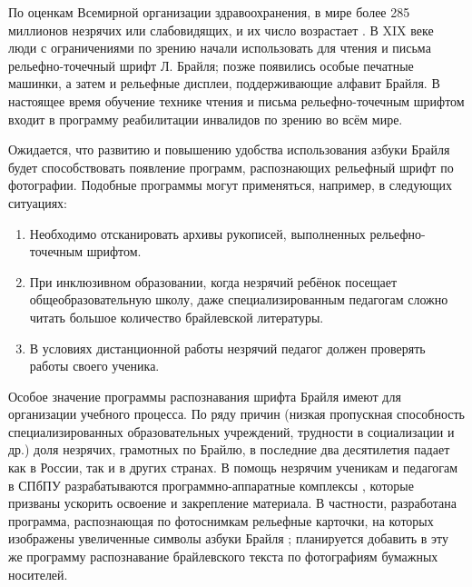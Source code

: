\documentclass{main.tex}[subfiles]
\begin{document}
По оценкам Всемирной организации здравоохранения, в мире более 285 миллионов незрячих или слабовидящих, и их число возрастает \cite{who_report2012}.
В XIX веке люди с ограничениями по зрению начали использовать для чтения и письма рельефно-точечный шрифт Л. Брайля; позже появились особые печатные машинки, а затем и рельефные дисплеи, поддерживающие алфавит Брайля.
В настоящее время обучение технике чтения и письма рельефно-точечным шрифтом входит в программу реабилитации инвалидов по зрению во всём мире.

Ожидается, что развитию и повышению удобства использования азбуки Брайля будет способствовать появление программ, распознающих рельефный шрифт по фотографии.
Подобные программы могут применяться, например, в следующих ситуациях:
\begin{enumerate}[noitemsep]
    \item Необходимо отсканировать архивы рукописей, выполненных рельефно-точечным шрифтом.
	\item При инклюзивном образовании, когда незрячий ребёнок посещает общеобразовательную школу, даже специализированным педагогам сложно читать большое количество брайлевской литературы.
    \item В условиях дистанционной работы незрячий педагог должен проверять работы своего ученика.
\end{enumerate}

Особое значение программы распознавания шрифта Брайля имеют для организации учебного процесса.
По ряду причин (низкая пропускная способность специализированных образовательных учреждений, трудности в социализации и др.) доля незрячих, грамотных по Брайлю, в последние два десятилетия падает как в России, так и в других странах.
В помощь незрячим ученикам и педагогам в СПбПУ разрабатываются программно-аппаратные комплексы \cite{begun2019, zuev2021}, которые призваны ускорить освоение и закрепление материала.
В частности, разработана программа, распознающая по фотоснимкам рельефные карточки, на которых изображены увеличенные символы азбуки Брайля \cite{zuev2021}; планируется добавить в эту же программу распознавание брайлевского текста по фотографиям бумажных носителей.
\end{document}
